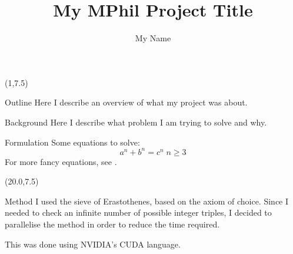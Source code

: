 \documentclass[final]{beamer}
\title{My MPhil Project Title}
\author{My Name}
\begin{document}
\begin{frame}{} 

\begin{textblock}{19.0}(1,7.5)
\begin{block}{Outline}
Here I describe an overview of what my project was about.
\end{block}

\begin{block}{Background}
Here I describe what problem I am trying to solve and why.
\end{block}

\begin{block}{Formulation}
Some equations to solve:
\begin{equation*}
a^n + b^n = c^n\;n \geqslant 3
\end{equation*}
For more fancy equations, see \cite{TeXBook}.
\end{block}


\end{textblock}


\begin{textblock}{19.0}(20.0,7.5)
\begin{block}{Method}
I used the sieve of Erastothenes, based on the axiom of choice. Since
I needed to check an infinite number of possible integer triples, I
decided to parallelise the method in order to reduce the time
required.\par
This was done using NVIDIA's CUDA language.
\end{block}

\end{textblock}



\end{frame}
\end{document}
